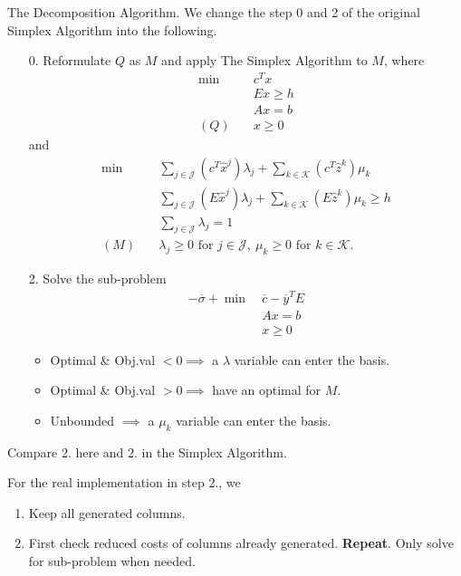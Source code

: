 \begin{prev}
	The Decomposition Algorithm. We change the step 0 and 2 of the original Simplex Algorithm into the following.
	\begin{enumerate}
		\item[0.] Reformulate \(Q\) as \(M\) and apply The Simplex Algorithm to \(M\), where
			\begin{align*}
				\min~    & c^Tx      \\
				         & Ex \geq h \\
				         & Ax = b    \\
				(Q)\quad & x\geq 0
			\end{align*}
			and
			\begin{align*}
				\min~    & \sum\limits_{j\in\mathcal{J}}\left(c^T\hat{x}^j\right)\lambda_{j} + \sum\limits_{k\in\mathcal{K}}\left(c^{T} \hat{z}^k  \right)\mu_k \\
				         & \sum\limits_{j\in\mathcal{J}}\left(E\hat{x}^j\right)\lambda_{j} + \sum\limits_{k\in\mathcal{K}}\left(E \hat{z}^k \right)\mu_k \geq h \\
				         & \sum\limits_{j\in\mathcal{J}}\lambda_{j} = 1                                                                                         \\
				(M)\quad & \lambda_{j}\geq 0 \text{ for }j\in\mathcal{J},\ \mu_k\geq 0 \text{ for }k\in\mathcal{K}.
			\end{align*}
		\item[2.] Solve the sub-problem
			\begin{align*}
				-\overline{\sigma}+\min~ & \overline{c} - \overline{y}^{T}E \\
				                         & Ax = b                           \\
				                         & x\geq 0
			\end{align*}
			\begin{itemize}
				\item Optimal \& Obj.val \(<0 \implies\) a \(\lambda\) variable can enter the basis.
				\item Optimal \& Obj.val \(>0 \implies\) have an optimal for \(M\).
				\item Unbounded \(\implies\) a \(\mu_k\) variable can enter the basis.
			\end{itemize}
	\end{enumerate}

	\begin{note}
		Compare 2. here and 2. in the Simplex Algorithm.
	\end{note}
	\begin{remark}
		For the real implementation in step 2., we
		\begin{enumerate}
			\item Keep all generated columns.
			\item First check reduced costs of columns already generated. \textbf{Repeat}. Only solve for sub-problem when needed.
		\end{enumerate}


\end{remark}
\end{prev}
